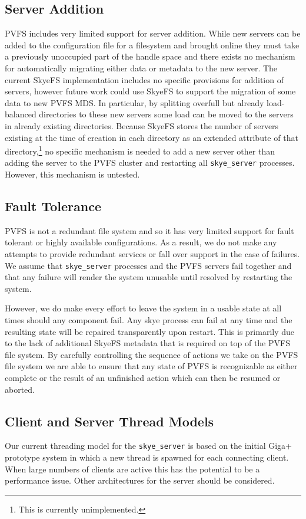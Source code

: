 \documentclass[letterpaper]{article}
\newcommand{\code}[1]{\texttt{#1}}
\begin{document}
\subsection{Server Addition}
PVFS includes very limited support for server addition.  While new servers can
be added to the configuration file for a filesystem and brought online they must
take a previously unoccupied part of the handle space and there exists no
mechanism for automatically migrating either data or metadata to the new server.
The current SkyeFS implementation includes no specific provisions for addition
of servers, however future work could use SkyeFS to support the migration of
some data to new PVFS MDS.  In particular, by splitting overfull but already
load-balanced directories to these new servers some load can be moved to the
servers in already existing directories.  Because SkyeFS stores the number of
servers existing at the time of creation in each directory as an extended
attribute of that directory,\footnote{This is currently unimplemented.} no
specific mechanism is needed to add a new server other than adding the server
to the PVFS cluster and restarting all \code{skye\_\-server} processes.  However,
this mechanism is untested.

\subsection{Fault Tolerance}
PVFS is not a redundant file system and so it has very limited support for fault
tolerant or highly available configurations.  As a result, we do not make any
attempts to provide redundant services or fall over support in the case of
failures.  We assume that \code{skye\_\-server} processes and the PVFS servers fail
together and that any failure will render the system unusable until resolved by
restarting the system.

However, we do make every effort to leave the system in a usable state at all
times should any component fail.  Any skye process can fail at any time and the
resulting state will be repaired transparently upon restart.  This is primarily
due to the lack of additional SkyeFS metadata that is required on top of the
PVFS file system.  By carefully controlling the sequence of actions we take on
the PVFS file system we are able to ensure that any state of PVFS is
recognizable as either complete or the result of an unfinished action which can
then be resumed or aborted.

\subsection{Client and Server Thread Models}
Our current threading model for the \code{skye\_\-server} is based on the initial Giga+
prototype system in which a new thread is spawned for each connecting client.
When large numbers of clients are active this has the potential to be a
performance issue.  Other architectures for the server should be considered. 
\end{document}
